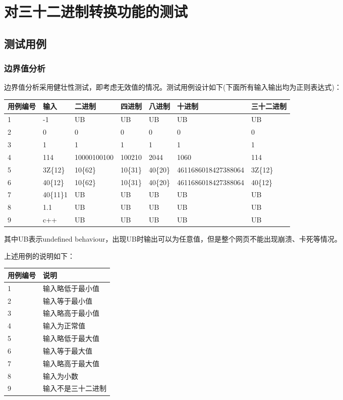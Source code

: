 \documentclass[12pt, a4paper, oneside]{ctexart}
\begin{document}
\section{对三十二进制转换功能的测试}

\subsection{测试用例}

\subsubsection{边界值分析}

边界值分析采用健壮性测试，即考虑无效值的情况。测试用例设计如下(下面所有输入输出均为正则表达式)：
\begin{table}[!h]
    \small
    \begin{tabular}{|l|l|l|l|l|l|l|}
    \hline
    用例编号 & 输入 & 二进制 & 四进制 & 八进制 & 十进制 & 三十二进制\\ \hline
    1 & -1 & UB & UB & UB & UB & UB \\ \hline
    2 & 0 & 0 & 0 & 0 & 0 & 0\\ \hline
    3 & 1 & 1 & 1 & 1 & 1 & 1 \\ \hline
    4 & 114 & 10000100100 & 100210 & 2044 & 1060 & 114 \\ \hline
    5 & 3Z\{12\} & 10\{62\} & 10\{31\} & 40\{20\} & 4611686018427388064 & 3Z\{12\}\\ \hline
    6 & 40\{12\} & 10\{62\} & 10\{31\} & 40\{20\} & 4611686018427388064 & 40\{12\}\\ \hline
    7 & 40\{11\}1 & UB & UB & UB & UB & UB \\ \hline
    8 & 1.1 & UB & UB & UB & UB & UB\\ \hline
    9 & c++ & UB & UB & UB & UB & UB\\ \hline
    \end{tabular}
\end{table}
其中UB表示undefined behaviour，出现UB时输出可以为任意值，但是整个网页不能出现崩溃、卡死等情况。


上述用例的说明如下：
\begin{table}[!h]
    \begin{tabular}{|l|l|}
    \hline
    用例编号 & 说明\\ \hline
    1 & 输入略低于最小值\\ \hline
    2 & 输入等于最小值\\ \hline
    3 & 输入略高于最小值 \\ \hline
    4 & 输入为正常值 \\ \hline   
    5 & 输入略低于最大值\\ \hline
    6 & 输入等于最大值 \\ \hline
    7 & 输入略高于最大值 \\ \hline
    8 & 输入为小数 \\ \hline
    9 & 输入不是三十二进制 \\ \hline
    \end{tabular}
\end{table}
\end{document}
